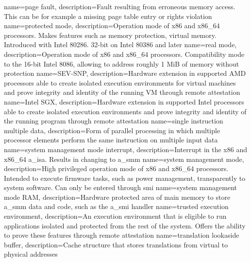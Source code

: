 %
{
    name=page fault,
    description={Fault resulting from erroneous memory access. This can be for example a missing page table entry or
            rights violation }
}
{
    name=protected mode,
    description={Operation mode of x86 and x86\_64 processors. Makes features such as memory protection, virtual memory.
            Introduced with Intel 80286. 32-bit on Intel 80386 and later}
}
%
{
    name=real mode,
    description={Operation mode of x86 and x86\_64 processors. Compatibility mode to the 16-bit Intel 8086, allowing to
            address roughly 1 MiB of memory without protection}
}
%
{
    name=SEV-SNP,
    description={Hardware extension in supported AMD processors able to create isolated execution environments for
            virtual machines and prove integrity and identity of the running VM through remote attestation}
}
{
    name=Intel SGX,
    description={Hardware extension in supported Intel processors able to create isolated execution environments and
            prove integrity and identity of the running program through remote attestation}
}
{
    name={single instruction multiple data},
    description={Form of parallel processing in which multiple processor elements perform the same instruction on
            multiple input data}
}
{
    name=system management mode interrupt,
    description={Interrupt in the x86 and x86\_64 \acrshort{a_isa}. Results in changing to \acrshort{a_smm}}
}
{
    name=system management mode,
    description={High privileged operation mode of x86 and x86\_64 processors. Intended to execute firmware tasks, such
            as power management, transparently to system software. Can only be entered through \acrshort{smi}}
}
{
    name=system management mode RAM,
    description={Hardware protected area of main memory to store \acrshort{a_smm} data and code, such as the
            \acrshort{a_smi} handler}
}
%
{
    name=trusted execution environment,
    description={An execution environment that is eligible to run applications isolated and protected from the rest of
            the system. Offers the ability to prove these features through remote attestation}
}
{
    name=translation lookaside buffer,
    description={Cache structure that stores translations from virtual to physical addresses}
}
